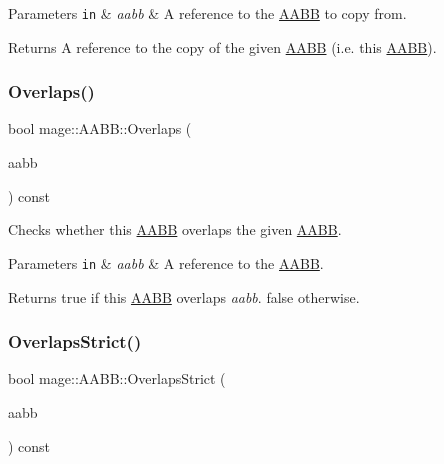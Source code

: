 \begin{DoxyParams}[1]{Parameters}
\mbox{\tt in}  & {\em aabb} & A reference to the \hyperlink{structmage_1_1_a_a_b_b}{A\+A\+BB} to copy from. \\
\hline
\end{DoxyParams}
\begin{DoxyReturn}{Returns}
A reference to the copy of the given \hyperlink{structmage_1_1_a_a_b_b}{A\+A\+BB} (i.\+e. this \hyperlink{structmage_1_1_a_a_b_b}{A\+A\+BB}). 
\end{DoxyReturn}
\hypertarget{structmage_1_1_a_a_b_b_a5a959edc3bc5ccdd29025d612c2e66e3}{}\label{structmage_1_1_a_a_b_b_a5a959edc3bc5ccdd29025d612c2e66e3} 
\subsubsection{\texorpdfstring{Overlaps()}{Overlaps()}}
{\footnotesize\ttfamily bool mage\+::\+A\+A\+B\+B\+::\+Overlaps (\begin{DoxyParamCaption}\item[{const \hyperlink{structmage_1_1_a_a_b_b}{A\+A\+BB} \&}]{aabb }\end{DoxyParamCaption}) const}

Checks whether this \hyperlink{structmage_1_1_a_a_b_b}{A\+A\+BB} overlaps the given \hyperlink{structmage_1_1_a_a_b_b}{A\+A\+BB}.


\begin{DoxyParams}[1]{Parameters}
\mbox{\tt in}  & {\em aabb} & A reference to the \hyperlink{structmage_1_1_a_a_b_b}{A\+A\+BB}. \\
\hline
\end{DoxyParams}
\begin{DoxyReturn}{Returns}
{\ttfamily true} if this \hyperlink{structmage_1_1_a_a_b_b}{A\+A\+BB} overlaps {\itshape aabb}. {\ttfamily false} otherwise. 
\end{DoxyReturn}
\hypertarget{structmage_1_1_a_a_b_b_ae8e6eca9c5e30015a91ab2e900594bfc}{}\label{structmage_1_1_a_a_b_b_ae8e6eca9c5e30015a91ab2e900594bfc} 
\subsubsection{\texorpdfstring{Overlaps\+Strict()}{OverlapsStrict()}}
{\footnotesize\ttfamily bool mage\+::\+A\+A\+B\+B\+::\+Overlaps\+Strict (\begin{DoxyParamCaption}\item[{const \hyperlink{structmage_1_1_a_a_b_b}{A\+A\+BB} \&}]{aabb }\end{DoxyParamCaption}) const}

